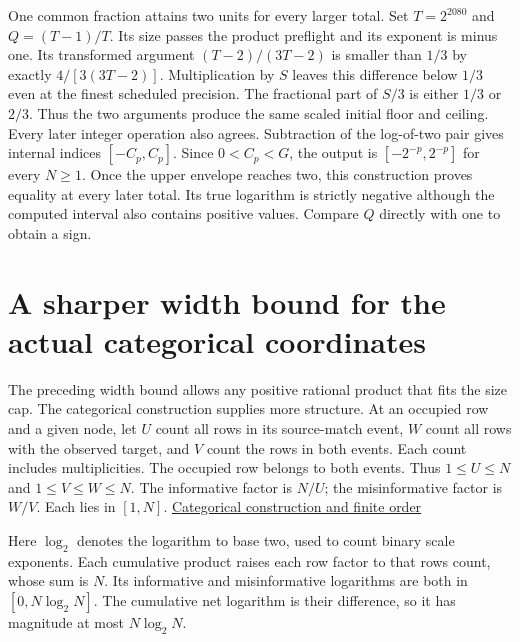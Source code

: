 One common fraction attains two units for every larger total. Set \(T=2^{2080}\) and \(Q=(T-1)/T\). Its size passes the product preflight and its exponent is minus one. Its transformed argument \((T-2)/(3T-2)\) is smaller than \(1/3\) by exactly \(4/[3(3T-2)]\). Multiplication by \(S\) leaves this difference below \(1/3\) even at the finest scheduled precision. The fractional part of \(S/3\) is either \(1/3\) or \(2/3\). Thus the two arguments produce the same scaled initial floor and ceiling. Every later integer operation also agrees. Subtraction of the log-of-two pair gives internal indices \([-C_p,C_p]\). Since \(0<C_p<G\), the output is \([-2^{-p},2^{-p}]\) for every \(N\ge1\). Once the upper envelope reaches two, this construction proves equality at every later total. Its true logarithm is strictly negative although the computed interval also contains positive values. Compare \(Q\) directly with one to obtain a sign.

\clearpage

\section{A sharper width bound for the actual categorical coordinates}\label{a-sharper-width-bound-for-the-actual-categorical-coordinates}

The preceding width bound allows any positive rational product that fits the size cap. The categorical construction supplies more structure. At an occupied row and a given node, let \(U\) count all rows in its source-match event, \(W\) count all rows with the observed target, and \(V\) count the rows in both events. Each count includes multiplicities. The occupied row belongs to both events. Thus \(1\le U\le N\) and \(1\le V\le W\le N\). The informative factor is \(N/U\); the misinformative factor is \(W/V\). Each lies in \([1,N]\). \href{https://github.com/sepahead/pid-rs/blob/main/audit/research/three-source-six-certificate-observations/README.md}{Categorical construction and finite order}

Here \(\log_2\) denotes the logarithm to base two, used to count binary scale exponents. Each cumulative product raises each row factor to that row\textquotesingle s count, whose sum is \(N\). Its informative and misinformative logarithms are both in \([0,N\log_2 N]\). The cumulative net logarithm is their difference, so it has magnitude at most \(N\log_2 N\).

